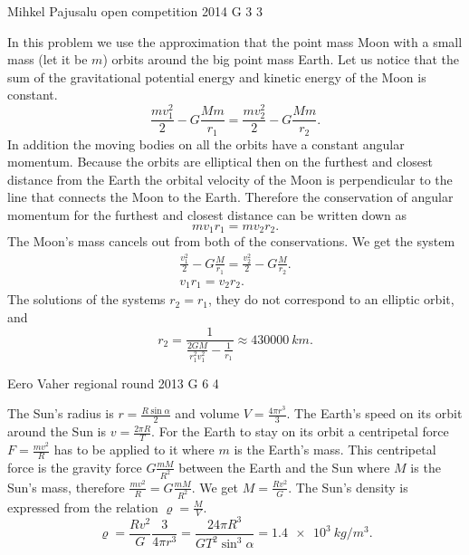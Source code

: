 \documentclass[11pt]{article}
\begin{document}
{Mihkel Pajusalu} %
{open competition} %
{2014} %
{G 3} %
{3} %
{

\ifEngSolution
In this problem we use the approximation that the point mass Moon with a small mass (let it be $m$) orbits around the big point mass Earth. Let us notice that the sum of the gravitational potential energy and kinetic energy of the Moon is constant. 
$$
\frac{mv_1^2}{2}-G\frac{Mm}{r_1}=\frac{mv_2^2}{2}-G\frac{Mm}{r_2}.
$$
In addition the moving bodies on all the orbits have a constant angular momentum. Because the orbits are elliptical then on the furthest and closest distance from the Earth the orbital velocity of the Moon is perpendicular to the line that connects the Moon to the Earth. Therefore the conservation of angular momentum for the furthest and closest distance can be written down as
$$
mv_1r_1=mv_2r_2.
$$
The Moon’s mass cancels out from both of the conservations. We get the system
$$
\begin{array}{c} 
\frac{v_1^2}{2}-G\frac{M}{r_1}=\frac{v_2^2}{2}-G\frac{M}{r_2}.\\
v_1r_1=v_2r_2.
\end{array}
$$
The solutions of the systems $r_2=r_1$, they do not correspond to an elliptic orbit, and
$$r_2=\frac{1}{\frac{2GM}{r_1^2v_1^2}-\frac{1}{r_1}}\approx\SI{430000}{km}.$$
\fi
}

{Eero Vaher} %
{regional round} %
{2013} %
{G 6} %
{4} %
{

\ifEngSolution
The Sun’s radius is $r=\frac{R\sin\alpha}{2}$ and volume $V=\frac{4\pi r^3}{3}$. The Earth’s speed on its orbit around the Sun is $v=\frac{2\pi R}{T}$. For the Earth to stay on its orbit a centripetal force $F=\frac{mv^2}{R}$ has to be applied to it where $m$ is the Earth’s mass. This centripetal force is the gravity force $G\frac{mM}{R^2}$ between the Earth and the Sun where $M$ is the Sun’s mass, therefore $\frac{mv^2}{R}=G\frac{mM}{R^2}$. We get $M=\frac{Rv^2}{G}$. The Sun’s density is expressed from the relation $\varrho=\frac{M}{V}$. 
$$\varrho=\frac{Rv^2}{G} \frac{3}{4\pi r^3}=\frac{24 \pi R^3}{G T^2 \sin^3 \alpha}=\SI{1,4e3}{kg/m^3}.$$
\fi
}
\end{document}
